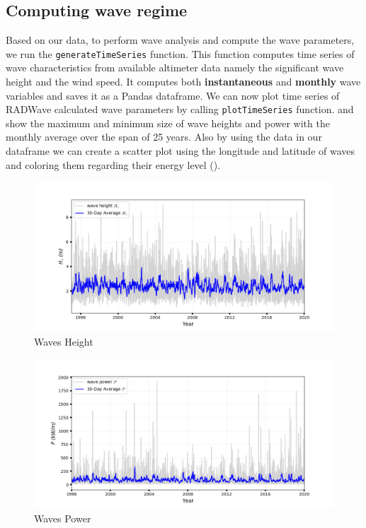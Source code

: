 \documentclass[12pt]{article}
\begin{document}
\subsection{Computing wave regime}
Based on our data, to perform wave analysis and compute the wave parameters, we run the \texttt{generateTimeSeries} function. This function computes time series of wave characteristics from available altimeter data namely the significant wave height and the wind speed. It computes both \textbf{instantaneous} and \textbf{monthly} wave variables and saves it as a Pandas dataframe. We can now plot time series of RADWave calculated wave parameters by calling \texttt{plotTimeSeries} function.
 and  show the maximum and minimum size of wave heights and power with the monthly average over the span of 25 years. Also by using the data in our dataframe we can create a scatter plot using the longitude and latitude of waves and coloring them regarding their energy level ().
\newpage

\begin{figure}[h]
    \centering
    \includegraphics[width=12 cm]{Hseries.png}
    \caption{Waves Height}
    \label{fig:fig2}
\end{figure}

\begin{figure}[h]
    \centering
    \includegraphics[width=12 cm]{Pseries.png}
    \caption{Waves Power}
    \label{fig:fig3}
\end{figure}
\end{document}
